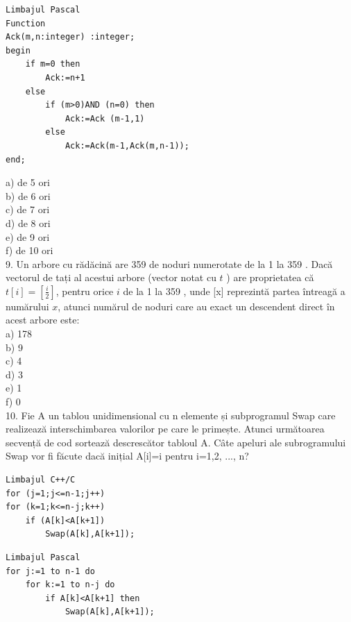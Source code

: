 \documentclass[10pt]{article}
\begin{document}
\begin{verbatim}
Limbajul Pascal
Function
Ack(m,n:integer) :integer;
begin
    if m=0 then
        Ack:=n+1
    else
        if (m>0)AND (n=0) then
            Ack:=Ack (m-1,1)
        else
            Ack:=Ack(m-1,Ack(m,n-1));
end;
\end{verbatim}

a) de 5 ori\\
b) de 6 ori\\
c) de 7 ori\\
d) de 8 ori\\
e) de 9 ori\\
f) de 10 ori\\
9. Un arbore cu rădăcină are 359 de noduri numerotate de la 1 la 359 . Dacă vectorul de tați al acestui arbore (vector notat cu $t$ ) are proprietatea că $t[i]=\left[\frac{i}{2}\right]$, pentru orice $i$ de la 1 la 359 , unde [x] reprezintă partea întreagă a numărului $x$, atunci numărul de noduri care au exact un descendent direct în acest arbore este:\\
a) 178\\
b) 9\\
c) 4\\
d) 3\\
e) 1\\
f) 0\\[0pt]
10. Fie A un tablou unidimensional cu n elemente și subprogramul Swap care realizează interschimbarea valorilor pe care le primește. Atunci următoarea secvență de cod sortează descrescător tabloul A. Câte apeluri ale subrogramului Swap vor fi făcute dacă inițial A[i]=i pentru i=1,2, ..., n?

\begin{verbatim}
Limbajul C++/C
for (j=1;j<=n-1;j++)
for (k=1;k<=n-j;k++)
    if (A[k]<A[k+1])
        Swap(A[k],A[k+1]);
\end{verbatim}

\begin{verbatim}
Limbajul Pascal
for j:=1 to n-1 do
    for k:=1 to n-j do
        if A[k]<A[k+1] then
            Swap(A[k],A[k+1]);
\end{verbatim}
\end{document}
